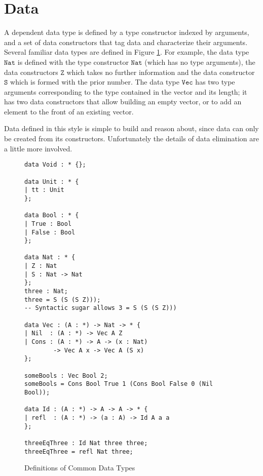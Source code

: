 \section{Data}


A dependent data type is defined by a type constructor indexed by arguments, and a set of data constructors that tag data and characterize their arguments.
Several familiar data types are defined in Figure \ref{fig:data-defs}.
For example, the data type $\mathtt{Nat}$ is defined with the type constructor $\mathtt{Nat}$ (which has no type arguments), the data constructors $\mathtt{Z}$ which takes no further information and the data constructor $\mathtt{S}$ which is formed with the prior number.
The data type $\mathtt{Vec}$ has two type arguments corresponding to the type contained in the vector and its length; it has two data constructors that allow building an empty vector, or to add an element to the front of an existing vector.

Data defined in this style is simple to build and reason about, since data can only be created from its constructors.
Unfortunately the details of data elimination are a little more involved.

\begin{figure}
\begin{lstlisting}[basicstyle={\ttfamily\small}]
data Void : * {};

data Unit : * {
| tt : Unit
};

data Bool : * {
| True : Bool
| False : Bool
};
 
data Nat : * {
| Z : Nat
| S : Nat -> Nat
};
three : Nat;
three = S (S (S Z)));
-- Syntactic sugar allows 3 = S (S (S Z)))

data Vec : (A : *) -> Nat -> * {
| Nil  : (A : *) -> Vec A Z
| Cons : (A : *) -> A -> (x : Nat)
        -> Vec A x -> Vec A (S x)
};

someBools : Vec Bool 2;
someBools = Cons Bool True 1 (Cons Bool False 0 (Nil Bool));

data Id : (A : *) -> A -> A -> * {
| refl  : (A : *) -> (a : A) -> Id A a a
};

threeEqThree : Id Nat three three;
threeEqThree = refl Nat three;
\end{lstlisting}
 \caption{Definitions of Common Data Types}
\label{fig:data-defs}
\end{figure}
